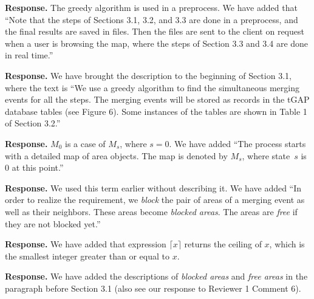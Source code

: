 \documentclass[a4paper,twoside,11pt]{reviewresponse}
\begin{document}
\textbf{Response.} 
The greedy algorithm is used in a preprocess.
We have added that
``Note that the steps of 
Sections 3.1, 3.2, and 3.3
are done in a preprocess, and the final results are saved in files.
Then the files are sent to the client on request
when a user is browsing the map,
where the steps of Section 3.3 and 3.4
are done in real time.''

\textbf{Response.} 
We have brought the description to 
the beginning of Section 3.1,
where the text is
``We use a greedy algorithm 
to find the simultaneous merging events for all the steps.
The merging events will be stored as records in the tGAP database tables
(see Figure 6).
Some instances of the tables are shown in 
Table 1 of Section 3.2.''



\textbf{Response.} 
$M_0$ is a case of $M_s$,
where $s=0$.
We have added ``The process starts with a detailed map of area objects.
The map is denoted by $M_s$, where state~$s$ is 0 at this point.''

\textbf{Response.}
We used this term earlier without describing it.
We have added 
``In order to realize the requirement,
we \emph{block} the pair of areas of a merging event
as well as their neighbors.
These areas become \emph{blocked areas}.
The areas are \emph{free} 
if they are not blocked yet.''

\textbf{Response.}
We have added that
expression $\lceil x \rceil$ returns the ceiling of $x$,
which is the smallest integer greater than or equal to $x$.

\textbf{Response.}
We have added the descriptions of 
\emph{blocked areas} and \emph{free areas}
in the paragraph before Section 3.1
(also see our response to Reviewer 1 Comment 6).
\end{document}
